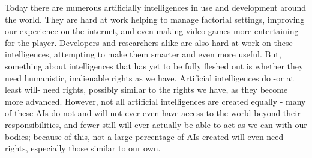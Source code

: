 Today there are numerous artificially intelligences in use and development around the world. They are hard at work helping to manage factorial settings, improving our experience on the internet, and even making video games more entertaining for the player. Developers and researchers alike are also hard at work on these intelligences, attempting to make them smarter and even more useful. But, something about intelligences that has yet to be fully fleshed out is whether they need humanistic, inalienable rights as we have. Artificial intelligences do -or at least will- need rights, possibly similar to the rights we have, as they become more advanced. However, not all artificial intelligences are created equally - many of these AIs do not and will not ever even have access to the world beyond their responsibilities, and fewer still will ever actually be able to act as we can with our bodies; because of this, not a large percentage of AIs created will even need rights, especially those similar to our own.
